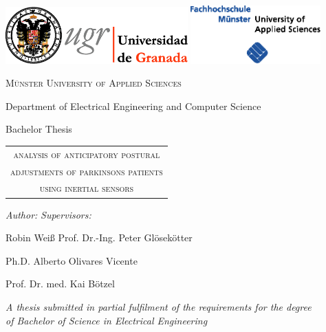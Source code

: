 \begin{titlepage}
\label{ch:titlepage}

\begin{center}

\includegraphics[width=7cm]{images/universidad_de_granada.eps}
	\hfill
\includegraphics[width=5cm]{images/fh-muenster.eps} 

\vspace{2.5cm}

{\large \textsc{Münster University of Applied Sciences}}

Department of Electrical Engineering and Computer Science

\vspace{1.2cm}

{\Large Bachelor Thesis}

\vspace{0.8cm}

\begin{huge}
	\renewcommand{\arraystretch}{0.7}
	\begin{tabular}{c}
		\textsc{analysis of anticipatory postural} \\
	    \textsc{adjustments of parkinsons patients} \\
	    \textsc{using inertial sensors} \\
	\end{tabular}
\end{huge}

\end{center}

\vspace{1cm}

\textit{Author:}  \hfill \textit{Supervisors:}

Robin Weiß \hfill Prof. Dr.-Ing. Peter Gl\"{o}sek\"{o}tter 

\hfill Ph.D. Alberto Olivares Vicente

\hfill Prof. Dr. med. Kai B\"{o}tzel

\vspace{1.5cm}

\begin{center}
	
\textit{A thesis submitted in partial fulfilment of the requirements for the degree\\
of Bachelor of Science in Electrical Engineering}

\vfill

\monthname \: \the\year 

\end{center}

\end{titlepage}
